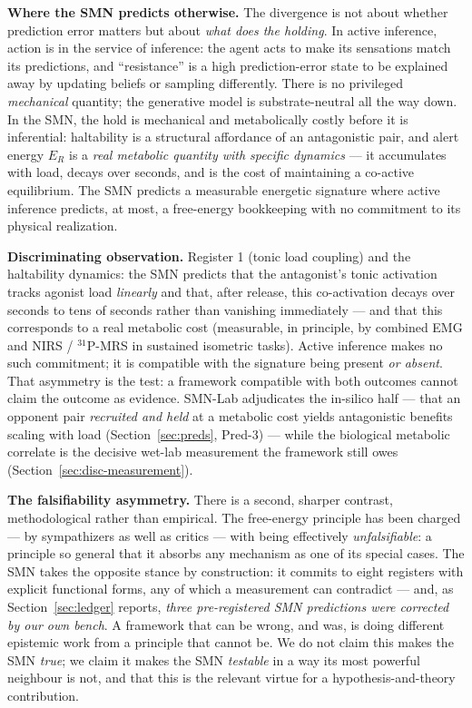 \documentclass[utf8]{FrontiersinHarvard} %
\begin{document}
\textbf{Where the SMN predicts otherwise.} The divergence is not about whether prediction error matters but about \emph{what does the holding}. In active inference, action is in the service of inference: the agent acts to make its sensations match its predictions, and ``resistance'' is a high prediction-error state to be explained away by updating beliefs or sampling differently. There is no privileged \emph{mechanical} quantity; the generative model is substrate-neutral all the way down. In the SMN, the hold is mechanical and metabolically costly before it is inferential: haltability is a structural affordance of an antagonistic pair, and alert energy $E_R$ is a \emph{real metabolic quantity with specific dynamics} --- it accumulates with load, decays over seconds, and is the cost of maintaining a co-active equilibrium. The SMN predicts a measurable energetic signature where active inference predicts, at most, a free-energy bookkeeping with no commitment to its physical realization.

\textbf{Discriminating observation.} Register 1 (tonic load coupling) and the haltability dynamics: the SMN predicts that the antagonist's tonic activation tracks agonist load \emph{linearly} and that, after release, this co-activation decays over seconds to tens of seconds rather than vanishing immediately --- and that this corresponds to a real metabolic cost (measurable, in principle, by combined EMG and NIRS / $^{31}$P-MRS in sustained isometric tasks). Active inference makes no such commitment; it is compatible with the signature being present \emph{or absent}. That asymmetry is the test: a framework compatible with both outcomes cannot claim the outcome as evidence. SMN-Lab adjudicates the in-silico half --- that an opponent pair \emph{recruited and held} at a metabolic cost yields antagonistic benefits scaling with load (Section~\ref{sec:preds}, Pred-3) --- while the biological metabolic correlate is the decisive wet-lab measurement the framework still owes (Section~\ref{sec:disc-measurement}).

\textbf{The falsifiability asymmetry.} There is a second, sharper contrast, methodological rather than empirical. The free-energy principle has been charged --- by sympathizers as well as critics --- with being effectively \emph{unfalsifiable}: a principle so general that it absorbs any mechanism as one of its special cases. The SMN takes the opposite stance by construction: it commits to eight registers with explicit functional forms, any of which a measurement can contradict --- and, as Section~\ref{sec:ledger} reports, \emph{three pre-registered SMN predictions were corrected by our own bench}. A framework that can be wrong, and was, is doing different epistemic work from a principle that cannot be. We do not claim this makes the SMN \emph{true}; we claim it makes the SMN \emph{testable} in a way its most powerful neighbour is not, and that this is the relevant virtue for a hypothesis-and-theory contribution.
\end{document}
